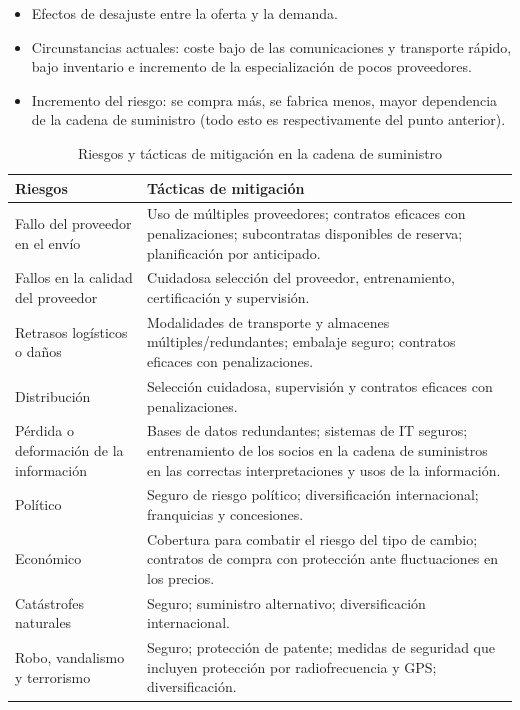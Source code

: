 \documentclass[12pt]{report} %
\providecommand{\tightlist}{%
  \setlength{\itemsep}{0pt}\setlength{\parskip}{0pt}}
\begin{document}
\begin{itemize}
\tightlist
\item
  Efectos de desajuste entre la oferta y la demanda.
\item
  Circunstancias actuales: coste bajo de las comunicaciones y transporte
  rápido, bajo inventario e incremento de la especialización de pocos
  proveedores.
\item
  Incremento del riesgo: se compra más, se fabrica menos, mayor
  dependencia de la cadena de suministro (todo esto es respectivamente
  del punto anterior).
\end{itemize}

\begin{table}[H]
\centering
\caption{Riesgos y tácticas de mitigación en la cadena de suministro}
\begin{tabular}{|p{6cm}|p{10cm}|}
\hline
\textbf{Riesgos} & \textbf{Tácticas de mitigación} \\ \hline
Fallo del proveedor en el envío & Uso de múltiples proveedores; contratos eficaces con penalizaciones; subcontratas disponibles de reserva; planificación por anticipado. \\ \hline
Fallos en la calidad del proveedor & Cuidadosa selección del proveedor, entrenamiento, certificación y supervisión. \\ \hline
Retrasos logísticos o daños & Modalidades de transporte y almacenes múltiples/redundantes; embalaje seguro; contratos eficaces con penalizaciones. \\ \hline
Distribución & Selección cuidadosa, supervisión y contratos eficaces con penalizaciones. \\ \hline
Pérdida o deformación de la información & Bases de datos redundantes; sistemas de IT seguros; entrenamiento de los socios en la cadena de suministros en las correctas interpretaciones y usos de la información. \\ \hline
Político & Seguro de riesgo político; diversificación internacional; franquicias y concesiones. \\ \hline
Económico & Cobertura para combatir el riesgo del tipo de cambio; contratos de compra con protección ante fluctuaciones en los precios. \\ \hline
Catástrofes naturales & Seguro; suministro alternativo; diversificación internacional. \\ \hline
Robo, vandalismo y terrorismo & Seguro; protección de patente; medidas de seguridad que incluyen protección por radiofrecuencia y GPS; diversificación. \\ \hline
\end{tabular}
\end{table}
\end{document}
